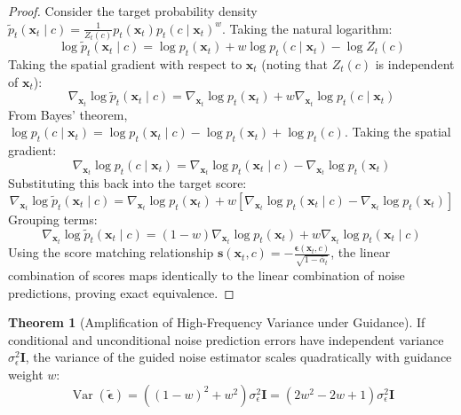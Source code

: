 \documentclass[11pt,a4paper]{article}
\theoremstyle{definition}
\newtheorem{theorem}{\textbf{Theorem}}[section]
\begin{document}
\begin{proof}
Consider the target probability density $\tilde{p}_t(\mathbf{x}_t \mid c) = \frac{1}{Z_t(c)} p_t(\mathbf{x}_t) p_t(c \mid \mathbf{x}_t)^w$. Taking the natural logarithm:
{\boldmath
\begin{equation}
\log \tilde{p}_t(\mathbf{x}_t \mid c) = \log p_t(\mathbf{x}_t) + w \log p_t(c \mid \mathbf{x}_t) - \log Z_t(c)
\end{equation}
}
Taking the spatial gradient with respect to $\mathbf{x}_t$ (noting that $Z_t(c)$ is independent of $\mathbf{x}_t$):
{\boldmath
\begin{equation}
\nabla_{\mathbf{x}_t} \log \tilde{p}_t(\mathbf{x}_t \mid c) = \nabla_{\mathbf{x}_t} \log p_t(\mathbf{x}_t) + w \nabla_{\mathbf{x}_t} \log p_t(c \mid \mathbf{x}_t)
\end{equation}
}
From Bayes' theorem, $\log p_t(c \mid \mathbf{x}_t) = \log p_t(\mathbf{x}_t \mid c) - \log p_t(\mathbf{x}_t) + \log p_t(c)$. Taking the spatial gradient:
{\boldmath
\begin{equation}
\nabla_{\mathbf{x}_t} \log p_t(c \mid \mathbf{x}_t) = \nabla_{\mathbf{x}_t} \log p_t(\mathbf{x}_t \mid c) - \nabla_{\mathbf{x}_t} \log p_t(\mathbf{x}_t)
\end{equation}
}
Substituting this back into the target score:
{\boldmath
\begin{equation}
\nabla_{\mathbf{x}_t} \log \tilde{p}_t(\mathbf{x}_t \mid c) = \nabla_{\mathbf{x}_t} \log p_t(\mathbf{x}_t) + w \left[ \nabla_{\mathbf{x}_t} \log p_t(\mathbf{x}_t \mid c) - \nabla_{\mathbf{x}_t} \log p_t(\mathbf{x}_t) \right]
\end{equation}
}
Grouping terms:
{\boldmath
\begin{equation}
\nabla_{\mathbf{x}_t} \log \tilde{p}_t(\mathbf{x}_t \mid c) = (1 - w)\nabla_{\mathbf{x}_t} \log p_t(\mathbf{x}_t) + w \nabla_{\mathbf{x}_t} \log p_t(\mathbf{x}_t \mid c)
\end{equation}
}
Using the score matching relationship $\mathbf{s}(\mathbf{x}_t, c) = -\frac{\boldsymbol{\epsilon}(\mathbf{x}_t, c)}{\sqrt{1 - \bar{\alpha}_t}}$, the linear combination of scores maps identically to the linear combination of noise predictions, proving exact equivalence.
\end{proof}

\begin{theorem}[Amplification of High-Frequency Variance under Guidance]
If conditional and unconditional noise prediction errors have independent variance $\sigma_\epsilon^2 \mathbf{I}$, the variance of the guided noise estimator scales quadratically with guidance weight $w$:
{\boldmath
\begin{equation}
\operatorname{Var}(\tilde{\boldsymbol{\epsilon}}) = \left( (1 - w)^2 + w^2 \right) \sigma_\epsilon^2 \mathbf{I} = \left( 2w^2 - 2w + 1 \right) \sigma_\epsilon^2 \mathbf{I}
\end{equation}
}
\end{theorem}
\end{document}
